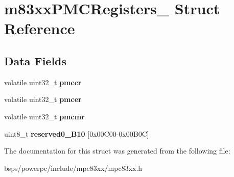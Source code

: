 \hypertarget{structm83xxPMCRegisters__}{}\section{m83xx\+P\+M\+C\+Registers\+\_\+ Struct Reference}
\label{structm83xxPMCRegisters__}
\subsection*{Data Fields}
\begin{DoxyCompactItemize}
\item 
\mbox{\label{structm83xxPMCRegisters___a465a7322d5c73bea0987c4d102c5c5ff}} 
volatile uint32\+\_\+t {\bfseries pmccr}
\item 
\mbox{\label{structm83xxPMCRegisters___a6f2a3363c76cf292693d2b423d6ed745}} 
volatile uint32\+\_\+t {\bfseries pmcer}
\item 
\mbox{\label{structm83xxPMCRegisters___a22ab6a2cf5958f45677cb66c1a6fbbce}} 
volatile uint32\+\_\+t {\bfseries pmcmr}
\item 
\mbox{\label{structm83xxPMCRegisters___aaa039c4e9b76b0b7dc3f874895266d67}} 
uint8\+\_\+t {\bfseries reserved0\+\_\+B10} \mbox{[}0x00\+C00-\/0x00\+B0\+C\mbox{]}
\end{DoxyCompactItemize}


The documentation for this struct was generated from the following file\+:\begin{DoxyCompactItemize}
\item 
bsps/powerpc/include/mpc83xx/mpc83xx.\+h\end{DoxyCompactItemize}
